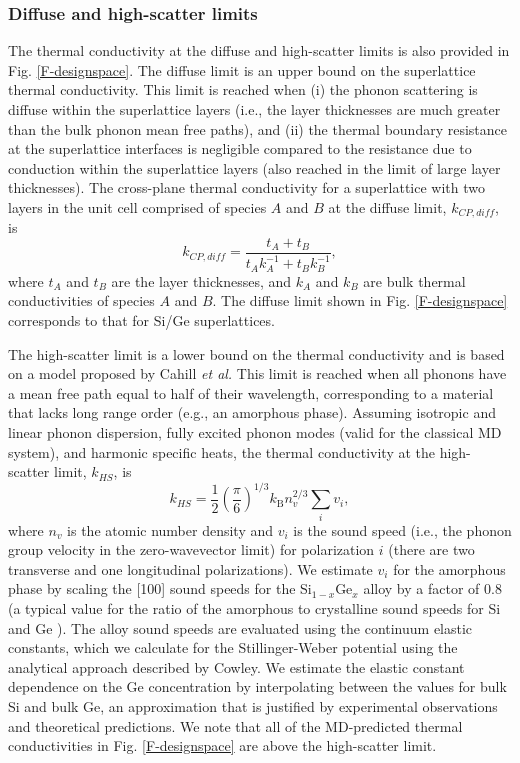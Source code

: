 \documentclass[letterpaper,12pt]{article}
\newcommand{\f}[2]{\ensuremath{\frac{\displaystyle{#1}}{\displaystyle{#2}}}}
\begin{document}
\subsubsection*{Diffuse and high-scatter limits}

The thermal conductivity at the diffuse and high-scatter limits is
also provided in Fig$.$ \ref{F-designspace}. The diffuse limit is an
upper bound on the superlattice thermal conductivity. This limit is
reached when (i) the phonon scattering is diffuse within the
superlattice layers (i.e., the layer thicknesses are much greater
than the bulk phonon mean free paths), and (ii) the thermal boundary
resistance at the superlattice interfaces is negligible compared to
the resistance due to conduction within the superlattice layers
(also reached in the limit of large layer thicknesses). The
cross-plane thermal conductivity for a superlattice with two layers
in the unit cell comprised of species $A$ and $B$ at the diffuse
limit, $k_{CP,diff}$, is
\begin{equation}
k_{CP, diff} = \frac{t_A + t_B}{t_Ak_A^{-1} + t_Bk_B^{-1}}
\label{E-kcp},
\end{equation}
where $t_A$ and $t_B$ are the layer thicknesses, and $k_A$ and $k_B$
are bulk thermal conductivities of species $A$ and $B$. The diffuse
limit shown in Fig$.$ \ref{F-designspace} corresponds to that for
Si/Ge superlattices.

The high-scatter limit is a lower bound on the thermal conductivity
and is based on a model proposed by Cahill \textit{et al.}
\cite{cahill1992} This limit is reached when all phonons have a mean
free path equal to half of their wavelength, corresponding to a
material that lacks long range order (e.g., an amorphous phase).
Assuming isotropic and linear phonon dispersion, fully excited
phonon modes (valid for the classical MD system), and harmonic
specific heats, the thermal conductivity at the high-scatter limit,
$k_{HS}$, is
\begin{equation}
k_{HS} = \f{1}{2}\left(\f{\pi}{6}\right)^{1/3} k_{\mathrm{B}}
n_v^{2/3} \sum_i v_i,
\end{equation}
where $n_v$ is the atomic number density and $v_i$ is the sound
speed (i.e., the phonon group velocity in the zero-wavevector limit)
for polarization $i$ (there are two transverse and one longitudinal
polarizations). We estimate $v_i$ for the amorphous phase by scaling
the [100] sound speeds for the Si$_{1-x}$Ge$_x$ alloy by a factor of
0.8 (a typical value for the ratio of the amorphous to crystalline
sound speeds for Si and Ge \cite{cahill1992,holland1963}). The alloy
sound speeds are evaluated using the continuum elastic constants,
which we calculate for the Stillinger-Weber potential using the
analytical approach described by Cowley.\cite{cowley1988} We
estimate the elastic constant dependence on the Ge concentration by
interpolating between the values for bulk Si and bulk Ge, an
approximation that is justified by experimental observations and
theoretical predictions.\cite{baker2000} We note that all of the
MD-predicted thermal conductivities in Fig$.$ \ref{F-designspace}
are above the high-scatter limit.
\end{document}
